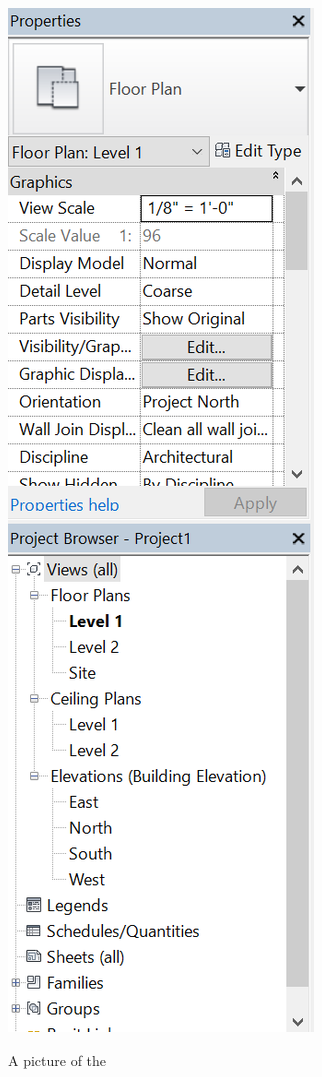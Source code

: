 \documentclass{tufte-book} %
\begin{document}
\begin{marginfigure}
	\includegraphics[width=\linewidth]{revitsidebar}
	\caption{A picture of the }
	\label{fig:revsidebar}
\end{marginfigure}
\end{document}
